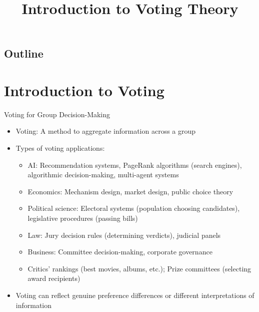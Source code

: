 \documentclass[10pt,handout]{beamer}
\title{Introduction to Voting Theory}
\author{}
\date{}
\begin{document}
\begin{frame}
\titlepage
\end{frame}

\subsection*{Outline}
\begin{frame}
  \tableofcontents
\end{frame}

\section{Introduction to Voting}

\begin{frame}{Voting for Group Decision-Making}
  \begin{itemize}[<+->]
    \item Voting: A method to aggregate information across a group
    \item Types of voting applications:
      \begin{itemize}
        \item AI: Recommendation systems, PageRank algorithms (search engines), algorithmic decision-making, multi-agent systems
        \item Economics: Mechanism design, market design, public choice theory
        \item Political science: Electoral systems (population choosing candidates), legislative procedures (passing bills)
        \item Law: Jury decision rules (determining verdicts), judicial panels
        \item Business: Committee decision-making, corporate governance
        \item Critics' rankings (best movies, albums, etc.); Prize committees (selecting award recipients)
      \end{itemize}
    \item Voting can reflect genuine preference differences or different interpretations of information
  \end{itemize}
\end{frame}
\end{document}
